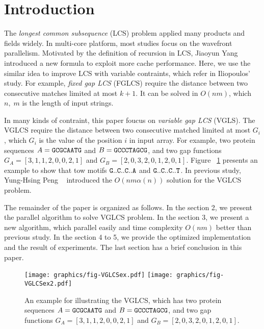 \section{Introduction} %
\label{sec:Introduction}

The \emph{longest common subsequence} (LCS) problem applied many products and fields widely.  In multi-core platform, most studies focus on the wavefront parallelism. Motivated by the definition of recursion in LCS, Jiaoyun Yang introduced a new formula to exploit more cache performance.  Here, we use the similar idea to improve LCS with variable contraints, which refer in Iliopoulos' study.  For example, \emph{fixed gap LCS} (FGLCS) require the distance between two consecutive matches limited at most $k+1$.  It can be solved in $O(nm)$, which $n, \; m$ is the length of input strings.

In many kinds of contraint, this paper foucus on \emph{variable gap LCS} (VGLS). The VGLCS require the distance between two consecutive matched limited at most $G_i$, which $G_i$ is the value of the position $i$ in input array. For example, two protein sequences $A = \tt{GCGCAATG}$ and $B = \tt{GCCCTAGCG}$, and two gap functions $G_A = [3, 1, 1, 2, 0, 0, 2, 1]$ and $G_B = [2, 0, 3, 2, 0, 1, 2, 0, 1]$. Figure ~\ref{fig:VGLCSex} presents an example to show that tow motifs $\tt{G..C..C..A}$ and $\tt{G..C..C..T}$.  In previous study, Yung-Hsing Peng ~\cite{yunghsing} introduced the $O(nm \alpha(n))$ solution for the VGLCS problem.

The remainder of the paper is organized as follows. In the section 2, we present the parallel algorithm to solve VGLCS problem. In the section 3, we present a new algorithm, which parallel easily and time complexity $O(nm)$ better than previous study. In the section 4 to 5, we provide the optimized implementation and the result of experiments. The last section has a brief conclusion in this paper.

\begin{figure}[!thb]
  \centering
  \texttt{[image: graphics/fig-VGLCSex.pdf]}
  \texttt{[image: graphics/fig-VGLCSex2.pdf]}
  \caption{An example for illustrating the VGLCS, which has two protein sequences $A = \tt{GCGCAATG}$ and $B = \tt{GCCCTAGCG}$, and two gap functions $G_A = [3, 1, 1, 2, 0, 0, 2, 1]$ and $G_B = [2, 0, 3, 2, 0, 1, 2, 0, 1]$.}
  \label{fig:VGLCSex}
\end{figure}